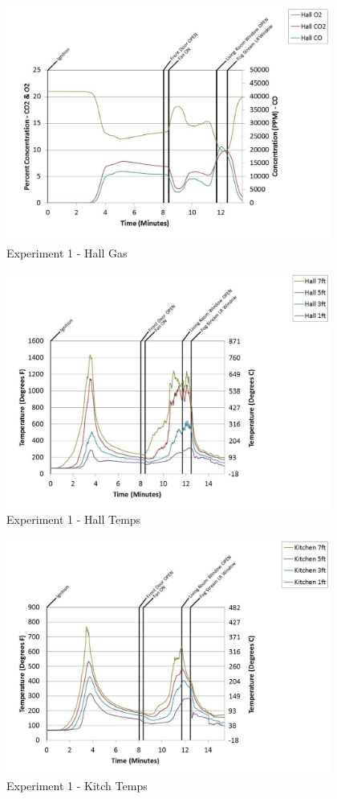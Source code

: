 \documentclass{article}
\begin{document}
\begin{appendices}
	\clearpage

	\begin{figure}[h!]
		\centering
		\includegraphics[height=3.05in]{0_Images/Results_Charts/Exp_1_Charts/HallGas.pdf}
		\caption{Experiment 1 - Hall Gas}
	\end{figure}
 

	\begin{figure}[h!]
		\centering
		\includegraphics[height=3.05in]{0_Images/Results_Charts/Exp_1_Charts/HallTemps.pdf}
		\caption{Experiment 1 - Hall Temps}
	\end{figure}
 
	\clearpage

	\begin{figure}[h!]
		\centering
		\includegraphics[height=3.05in]{0_Images/Results_Charts/Exp_1_Charts/KitchTemps.pdf}
		\caption{Experiment 1 - Kitch Temps}
	\end{figure}
 


\end{appendices}
\end{document}
